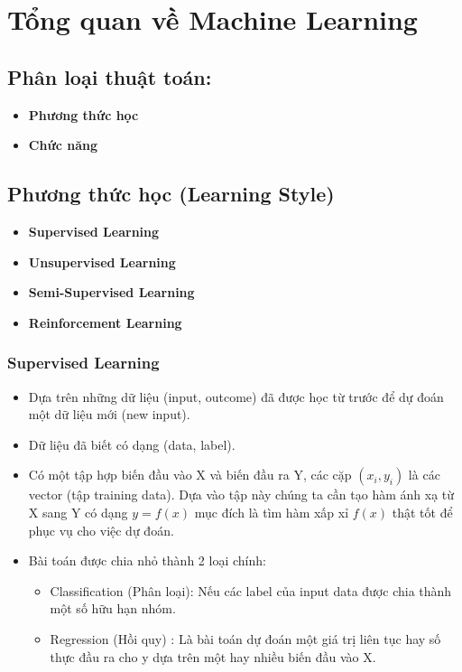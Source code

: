 \chapter{Tổng quan về Machine Learning}

\section{Phân loại thuật toán:}
\begin{itemize}
    \item \textbf{Phương thức học}
    \item \textbf{Chức năng}
\end{itemize}


\section{Phương thức học (Learning Style)}
\begin{itemize}
    \item \textbf{Supervised Learning}
    \item \textbf{Unsupervised Learning}
    \item \textbf{Semi-Supervised Learning} 
    \item \textbf{Reinforcement Learning}
\end{itemize}
    \subsection{Supervised Learning}
    \begin{itemize}
        \item Dựa trên những dữ liệu (input, outcome) đã được học từ trước để dự đoán một dữ liệu mới (new input).
        \item Dữ liệu đã biết có dạng (data, label).
        \item Có một tập hợp biến đầu vào X và biến đầu ra Y, các cặp $(x_i, y_i)$ là các vector (tập training data). Dựa vào tập này chúng ta cần tạo hàm ánh xạ từ X sang Y có dạng $y = f(x)$ mục đích là tìm hàm xấp xỉ $f(x)$ thật tốt để phục vụ cho việc dự đoán.
        \item Bài toán được chia nhỏ thành 2 loại chính:
        \begin{itemize}
            \item Classification (Phân loại): Nếu các label của input data được chia thành một số hữu hạn nhóm.
            \item Regression (Hồi quy) : Là bài toán dự đoán một giá trị liên tục hay số thực đầu ra cho y dựa trên một hay nhiều biến đầu vào X.
        \end{itemize}
    \end{itemize}
